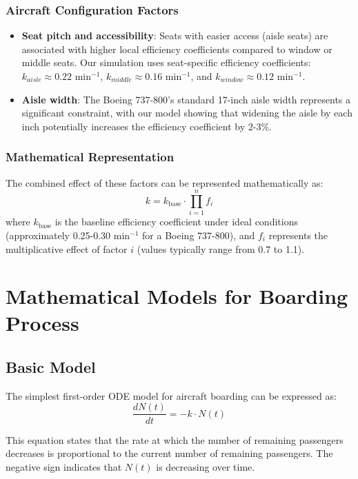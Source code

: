 \documentclass[12pt,a4paper]{article}
\begin{document}
\subsubsection{Aircraft Configuration Factors}
\begin{itemize}
\item \textbf{Seat pitch and accessibility}: Seats with easier access (aisle seats) are associated with higher local efficiency coefficients compared to window or middle seats. Our simulation uses seat-specific efficiency coefficients: $k_{aisle} \approx 0.22$ min$^{-1}$, $k_{middle} \approx 0.16$ min$^{-1}$, and $k_{window} \approx 0.12$ min$^{-1}$.

\item \textbf{Aisle width}: The Boeing 737-800's standard 17-inch aisle width represents a significant constraint, with our model showing that widening the aisle by each inch potentially increases the efficiency coefficient by 2-3\%.
\end{itemize}

\subsubsection{Mathematical Representation}
The combined effect of these factors can be represented mathematically as:
\begin{equation}
k = k_{\text{base}} \cdot \prod_{i=1}^{n} f_i
\end{equation}
where $k_{\text{base}}$ is the baseline efficiency coefficient under ideal conditions (approximately 0.25-0.30 min$^{-1}$ for a Boeing 737-800), and $f_i$ represents the multiplicative effect of factor $i$ (values typically range from 0.7 to 1.1).

\section{Mathematical Models for Boarding Process}

\subsection{Basic Model}
The simplest first-order ODE model for aircraft boarding can be expressed as:
\begin{equation}
\frac{dN(t)}{dt} = -k \cdot N(t)
\label{eq:basic_boarding}
\end{equation}

This equation states that the rate at which the number of remaining passengers decreases is proportional to the current number of remaining passengers. The negative sign indicates that $N(t)$ is decreasing over time.
\end{document}
